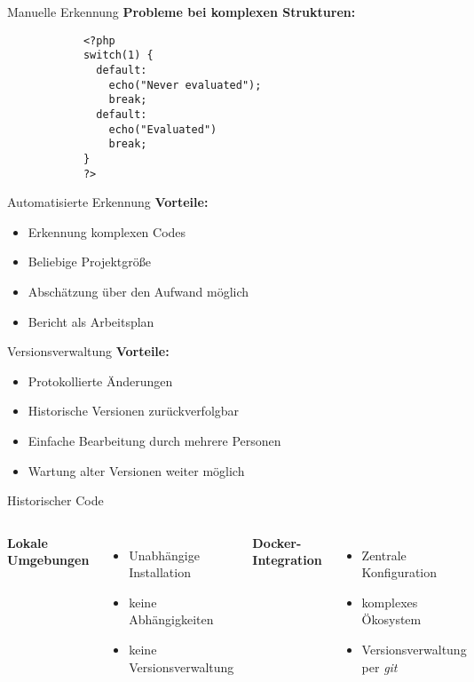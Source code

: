 
    \begin{frame}[fragile] {Manuelle Erkennung}
        \textbf{Probleme bei komplexen Strukturen:}
		\begin{lstlisting}
            <?php
            switch(1) {
              default:
                echo("Never evaluated");
                break;
              default:
                echo("Evaluated")
                break;
            }
            ?>
        \end{lstlisting}
    \end{frame}
    
    \begin{frame} {Automatisierte Erkennung}
        \textbf{Vorteile:}
        \begin{itemize}
            \item Erkennung komplexen Codes
            \item Beliebige Projektgröße
            \item Abschätzung über den Aufwand möglich
            \item Bericht als Arbeitsplan
        \end{itemize}
    \end{frame}

    \begin{frame} {Versionsverwaltung}
        \textbf{Vorteile:}
        \begin{itemize}
            \item Protokollierte Änderungen
            \item Historische Versionen zurückverfolgbar
            \item Einfache Bearbeitung durch mehrere Personen
            \item Wartung alter Versionen weiter möglich
        \end{itemize}
    \end{frame}
    
    \begin{frame} {Historischer Code}
        \begin{columns}[T,onlytextwidth]
                \textbf{Lokale Umgebungen}
                \begin{itemize}
                    \item Unabhängige Installation
                    \item keine Abhängigkeiten
                    \item keine Versionsverwaltung
                \end{itemize}
                \textbf{Docker-Integration} \nocite{anderson_docker_2015}
                \begin{itemize}
                    \item Zentrale Konfiguration
                    \item komplexes Ökosystem
                    \item Versionsverwaltung per \emph{git}
                \end{itemize}
          \end{columns}
    \end{frame}